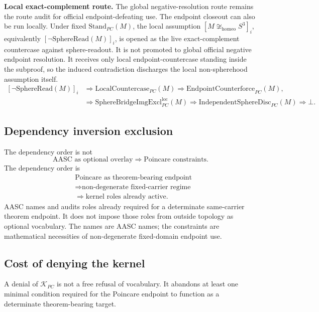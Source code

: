 \documentclass[11pt]{article}
\newcommand{\Sthree}{S^{3}}
\newcommand{\StandPC}{\mathrm{Stand}_{PC}}
\newcommand{\SphereRead}{\mathrm{SphereRead}}
\newcommand{\KPC}{\mathcal{K}_{PC}}
\newcommand{\IndependentSphereDisc}{\mathrm{IndependentSphereDisc}_{PC}}
\newcommand{\SphereBridgeImgExclLoc}{\mathrm{SphereBridgeImgExcl}^{\mathrm{loc}}_{PC}}
\newcommand{\LocalCountercasePC}{\mathrm{LocalCountercase}_{PC}}
\newcommand{\EndpointCounterforcePC}{\mathrm{EndpointCounterforce}_{PC}}
\newcommand{\Homeo}{\cong_{\mathrm{homeo}}}
\begin{document}
\begin{mdframed}[backgroundcolor=gray!8,linewidth=0.6pt]
\textbf{Local exact-complement route.} The global negative-resolution route remains the route audit for official endpoint-defeating use. The endpoint closeout can also be run locally. Under fixed \(\StandPC(M)\), the local assumption \([M\not\Homeo\Sthree]_i\), equivalently \([\neg\SphereRead(M)]_i\), is opened as the live exact-complement countercase against sphere-readout. It is not promoted to global official negative endpoint resolution. It receives only local endpoint-countercase standing inside the subproof, so the induced contradiction discharges the local non-spherehood assumption itself.
\[
\begin{aligned}
[\neg\SphereRead(M)]_i
&\Rightarrow \LocalCountercasePC(M)
 \Rightarrow \EndpointCounterforcePC(M),\\
&\Rightarrow \SphereBridgeImgExclLoc(M)
 \Rightarrow \IndependentSphereDisc(M)
 \Rightarrow \bot.
\end{aligned}
\]
\end{mdframed}

\subsection*{Dependency inversion exclusion}
The dependency order is not
\[
\text{AASC as optional overlay}\Rightarrow\text{Poincare constraints}.
\]
The dependency order is
\[
\begin{aligned}
&\text{Poincare as theorem-bearing endpoint}\\
&\Rightarrow\text{non-degenerate fixed-carrier regime}\\
&\Rightarrow\text{kernel roles already active}.
\end{aligned}
\]
AASC names and audits roles already required for a determinate same-carrier theorem endpoint. It does not impose those roles from outside topology as optional vocabulary. The names are AASC names; the constraints are mathematical necessities of non-degenerate fixed-domain endpoint use.

\subsection*{Cost of denying the kernel}
A denial of \(\KPC\) is not a free refusal of vocabulary. It abandons at least one minimal condition required for the Poincare endpoint to function as a determinate theorem-bearing target.
\end{document}
